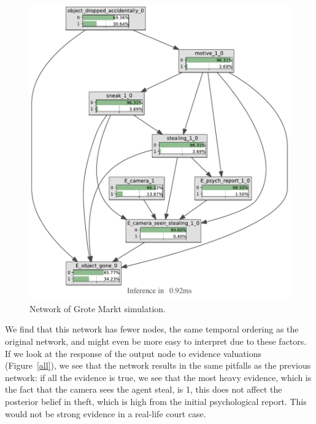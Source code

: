 \begin{enumerate}
\begin{figure}
\begin{center}
\includegraphics[width=1.2\linewidth]{../experiments/GroteMarktPrivate/bnImage/BNIMAGEGroteMarktPrivate.pdf}
\caption{Network of Grote Markt simulation.}
\label{everything}
\end{center}
\end{figure}

We find that this network has fewer nodes, the same temporal ordering as the original network, and might even be more easy to interpret due to these factors. If we look at the response of the output node to evidence valuations (Figure~\ref{all}), we see that the network results in the same pitfalls as the previous network: if all the evidence is true, we see that the most heavy evidence, which is the fact that the camera sees the agent steal, is 1, this does not affect the posterior belief in theft, which is high from the initial psychological report. This would not be strong evidence in a real-life court case.


\end{enumerate}
